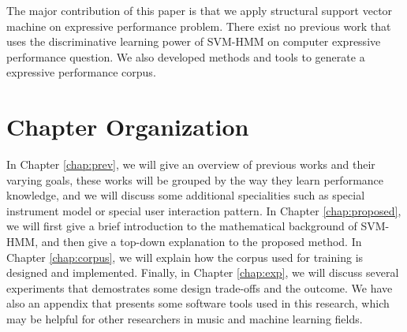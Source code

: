 The major contribution of this paper is that we apply structural support vector machine on expressive performance problem. There exist no previous work that uses the discriminative learning power of SVM-HMM on computer expressive performance question. We also developed methods and tools to generate a expressive performance corpus.
%
%
\section{Chapter Organization}
In Chapter \ref{chap:prev}, we will give an overview of previous works and their varying goals, these works will be grouped by the way they learn performance knowledge, and we will discuss some additional specialities such as special instrument model or special user interaction pattern. In Chapter \ref{chap:proposed}, we will first give a brief introduction to the mathematical background of SVM-HMM, and then give a top-down explanation to the proposed method. In Chapter \ref{chap:corpus}, we will explain how the corpus used for training is designed and implemented. Finally, in Chapter \ref{chap:exp}, we will discuss several experiments that demostrates some design trade-offs and the outcome. We have also an appendix that presents some software tools used in this research, which may be helpful for other researchers in music and machine learning fields.
